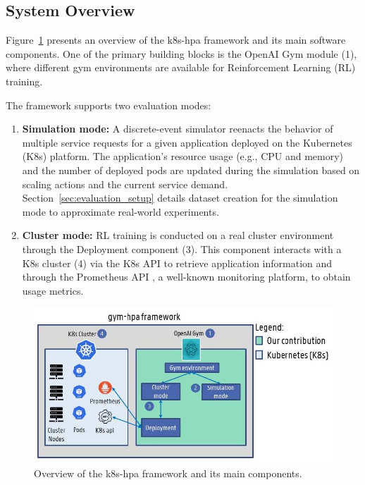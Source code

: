 \documentclass[conference]{IEEEtran}
\begin{document}
\subsection{System Overview}

Figure~\ref{fig:k8s-hpa-overview} presents an overview of the k8s-hpa framework and its main software components. One of the primary building blocks is the OpenAI Gym module (1), where different gym environments are available for Reinforcement Learning (RL) training. 

The framework supports two evaluation modes:
\begin{enumerate}
    \item \textbf{Simulation mode:} A discrete-event simulator reenacts the behavior of multiple service requests for a given application deployed on the Kubernetes (K8s) platform. The application's resource usage (e.g., CPU and memory) and the number of deployed pods are updated during the simulation based on scaling actions and the current service demand. Section~\ref{sec:evaluation_setup} details dataset creation for the simulation mode to approximate real-world experiments.
    \item \textbf{Cluster mode:} RL training is conducted on a real cluster environment through the Deployment component (3). This component interacts with a K8s cluster (4) via the K8s API to retrieve application information and through the Prometheus API \cite{turnbull2018prometheus}, a well-known monitoring platform, to obtain usage metrics.
\end{enumerate}

\begin{figure}[h]
    \centering
    \includegraphics[width=\linewidth]{images/2024_11_17_21ad14b6196e5740bf69g-4}
    \caption{Overview of the k8s-hpa framework and its main components.}
    \label{fig:k8s-hpa-overview}
\end{figure}
\end{document}
